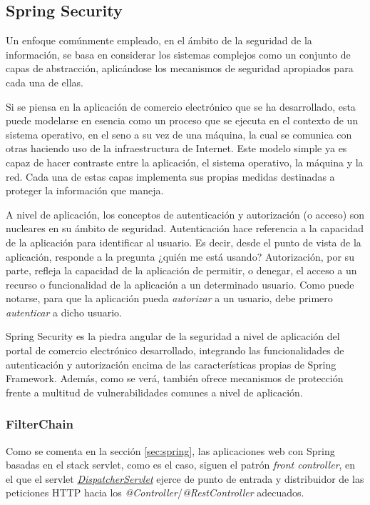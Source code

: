 \documentclass[a4paper]{article}
\begin{document}
	\subsection{Spring Security} \label{sec:springsec}
	Un enfoque comúnmente empleado, en el ámbito de la seguridad de la información, se basa en considerar los sistemas complejos como un conjunto de capas de abstracción, aplicándose los mecanismos de seguridad apropiados para cada una de ellas.
	
	Si se piensa en la aplicación de comercio electrónico que se ha desarrollado, esta puede modelarse en esencia como un proceso que se ejecuta en el contexto de un sistema operativo, en el seno a su vez de una máquina, la cual se comunica con otras haciendo uso de la infraestructura de Internet. Este modelo simple ya es capaz de hacer contraste entre la aplicación, el sistema operativo, la máquina y la red. Cada una de estas capas implementa sus propias medidas destinadas a proteger la información que maneja.
	
	A nivel de aplicación, los conceptos de autenticación y autorización (o acceso) son nucleares en su ámbito de seguridad. Autenticación hace referencia a la capacidad de la aplicación para identificar al usuario. Es decir, desde el punto de vista de la aplicación, responde a la pregunta ¿quién me está usando? Autorización, por su parte, refleja la capacidad de la aplicación de permitir, o denegar, el acceso a un recurso o funcionalidad de la aplicación a un determinado usuario. Como puede notarse, para que la aplicación pueda \emph{autorizar} a un usuario, debe primero \emph{autenticar} a dicho usuario.
	
	Spring Security es la piedra angular de la seguridad a nivel de aplicación del portal de comercio electrónico desarrollado, integrando las funcionalidades de autenticación y autorización encima de las características propias de Spring Framework. Además, como se verá, también ofrece mecanismos de protección frente a multitud de vulnerabilidades comunes a nivel de aplicación.
	
	\subsubsection{FilterChain}
	Como se comenta en la sección \ref{sec:spring}, las aplicaciones web con Spring basadas en el stack servlet, como es el caso, siguen el patrón \emph{front controller}, en el que el servlet \href{https://docs.spring.io/spring/docs/current/spring-framework-reference/web.html#mvc-servlet}{\emph{DispatcherServlet}} ejerce de punto de entrada y distribuidor de las peticiones HTTP hacia los \emph{@Controller}/\emph{@RestController} adecuados.
	
\end{document}
